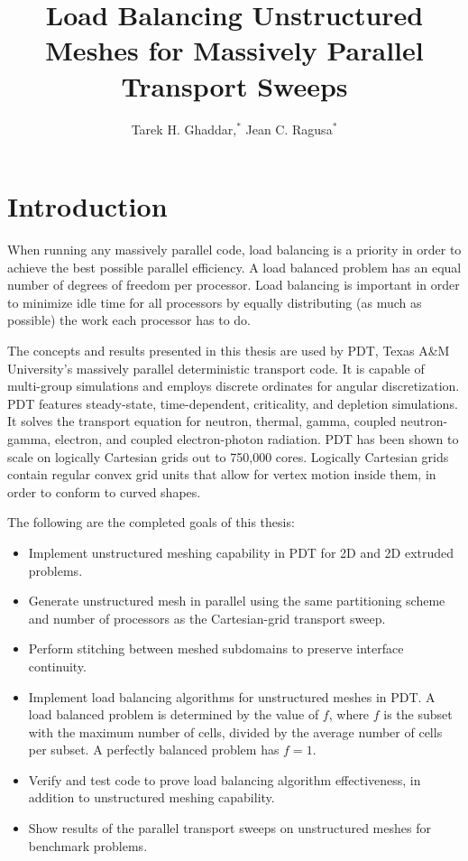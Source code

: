 \documentclass{anstrans}
\title{Load Balancing Unstructured Meshes for Massively Parallel Transport Sweeps}
\author{Tarek H. Ghaddar,$^{*}$ Jean C. Ragusa$^{*}$}
\institute{
$^{*}$Dept. of Nuclear Engineering, Texas A\&M University, College Station, TX, 77843-3133
\and
}
\begin{document}
\section{Introduction}
\label{ch:introduction}
When running any massively parallel code, load balancing is a priority in order to achieve the best possible parallel efficiency. A load balanced problem has an equal number of degrees of freedom per processor. Load balancing is important in order to minimize idle time for all processors by equally distributing (as much as possible) the work each processor has to do.

The concepts and results presented in this thesis are used by PDT, Texas A\&M University's massively parallel deterministic transport code. It is capable of multi-group simulations and employs discrete ordinates for angular discretization. PDT features steady-state, time-dependent, criticality, and depletion simulations. It solves the transport equation for neutron, thermal, gamma, coupled neutron-gamma, electron, and coupled electron-photon radiation. PDT  has been shown to scale on logically Cartesian grids out to 750,000 cores. Logically Cartesian grids contain regular convex grid units that allow for vertex motion inside them, in order to conform to curved shapes. 

The following are the completed goals of this thesis:
\begin{itemize}
\item Implement unstructured meshing capability in PDT for 2D and 2D extruded problems.
\item Generate unstructured mesh in parallel using the same partitioning scheme and number of processors as the Cartesian-grid transport sweep.
\item {Perform stitching between meshed subdomains to preserve interface continuity.}
\item Implement load balancing algorithms for unstructured meshes in PDT. A load balanced problem is determined by the value of $f$, where $f$ is the subset with the maximum number of cells, divided by the average number of cells per subset. A perfectly balanced problem has $f = 1$.
\item Verify and test code to prove load balancing algorithm effectiveness, in addition to unstructured meshing capability. 
\item Show results of the parallel transport sweeps on unstructured meshes for benchmark problems.
\end{itemize}
\end{document}
